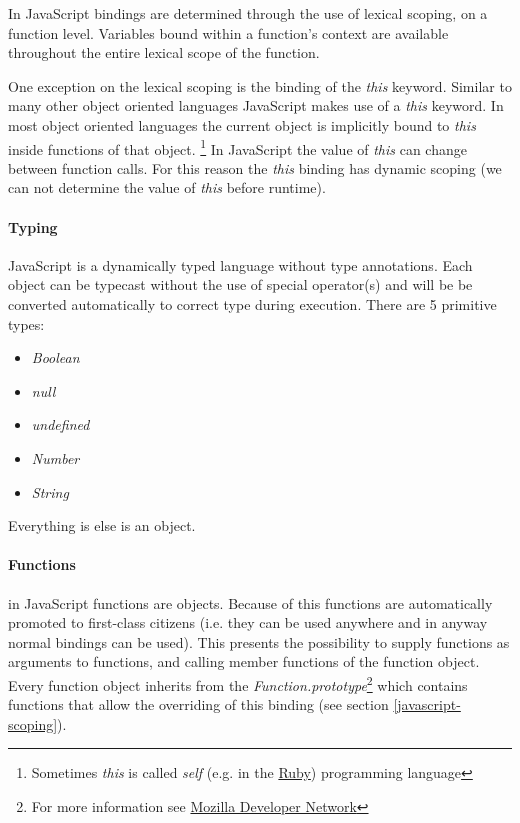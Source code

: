 In JavaScript bindings are determined through the use of lexical scoping, on a function level. Variables bound within a function's context are available throughout the entire lexical scope of the function. 

One exception on the lexical scoping is the binding of the \textit{this} keyword. Similar to many other object oriented languages JavaScript makes use of a \textit{this} keyword. In most object oriented languages the current object is implicitly bound to \textit{this} inside functions of that object. \footnote{Sometimes \textit{this} is called \textit{self} (e.g. in the \href{http://ruby.org}{Ruby}) programming language} In JavaScript the value of \textit{this} can change between function calls. For this reason the \textit{this} binding has dynamic scoping (we can not determine the value of \textit{this} before runtime). 

\paragraph{Typing} \label{javascript-typing}
JavaScript is a dynamically typed language without type annotations. Each object can be typecast without the use of special operator(s) and will be be converted automatically to correct type during execution. There are 5 primitive types: 

\begin{itemize}
	\item \textit{Boolean}
	\item \textit{null}
	\item \textit{undefined}
	\item \textit{Number}
	\item \textit{String}
\end{itemize}

Everything is else is an object.

\paragraph{Functions} \label{javascript-functions}
in JavaScript functions are objects. Because of this functions are automatically promoted to first-class citizens (i.e. they can be used anywhere and in anyway normal bindings can be used). This presents the possibility to supply functions as arguments to functions, and calling member functions of the function object. Every function object inherits from the \textit{Function.prototype}\footnote{For more information see \href{https://developer.mozilla.org/en-US/docs/Web/JavaScript/Reference/Global_Objects/Function/prototype}{Mozilla Developer Network}} which contains functions that allow the overriding of this binding (see section \ref{javascript-scoping}).


